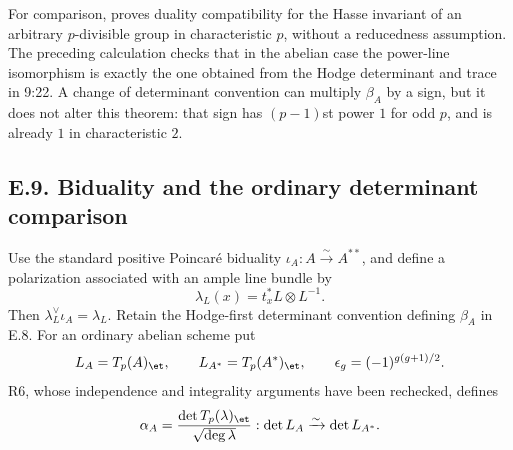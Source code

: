 For comparison, \cite[Lemma~2.1.2, Proposition~2.1.3, Theorem~2.1.4]{Bijakowski2018} proves duality compatibility for the Hasse invariant of an arbitrary $p$-divisible group in characteristic $p$, without a reducedness assumption.  The preceding calculation checks that in the abelian case the power-line isomorphism is exactly the one obtained from the Hodge determinant and trace in 9:22.  A change of determinant convention can multiply $\beta_A$ by a sign, but it does not alter this theorem: that sign has $(p-1)$st power $1$ for odd $p$, and is already $1$ in characteristic $2$.

\subsection{E.9. Biduality and the ordinary determinant comparison}

Use the standard positive Poincar\'e biduality $\iota_A:A\xrightarrow{\sim}A^{**}$, and define a polarization associated with an ample line bundle by
\[
                 \lambda_L(x)=t_x^*L\otimes L^{-1}.
\]
Then $\lambda_L^\vee\iota_A=\lambda_L$.  Retain the Hodge-first determinant convention defining $\beta_A$ in E.8.  For an ordinary abelian scheme put
\[
 L_A=T_p(A)_{\et},\qquad L_{A^*}=T_p(A^*)_{\et},\qquad
 \epsilon_g=(-1)^{g(g+1)/2}.
\]
R6, whose independence and integrality arguments have been rechecked, defines
\[
 \alpha_A=\frac{\det T_p(\lambda)_{\et}}{\sqrt{\deg\lambda}}:
                      \det L_A\xrightarrow{\sim}\det L_{A^*}.
\]

